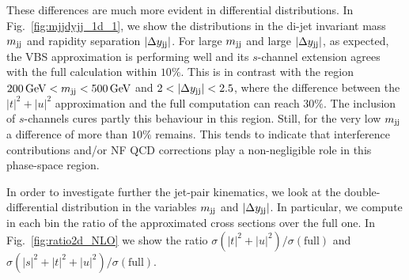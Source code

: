 These differences are much more evident in differential distributions.
In Fig.~\ref{fig:mjjdyjj_1d_1}, we show the distributions in the di-jet invariant mass $m_{\text{j}\text{j}}$ and rapidity separation $|\Delta y_{\text{j}\text{j}}|$.
For large $m_{\text{j}\text{j}}$ and large $|\Delta y_{\text{j}\text{j}}|$, as expected, the VBS approximation is performing well and its $s$-channel extension agrees with the full calculation within $10\%$.
This is in contrast with the region  $200 \,\text{GeV} < m_{\text{j}\text{j}} < 500 \,\text{GeV}$ and $2<|\Delta y_{\Pj\Pj}|<2.5$, where
the difference between the $|t|^2+|u|^2$ approximation and the full computation can reach $30\%$.
The inclusion of $s$-channels cures partly this behaviour in this region.
Still, for the very low $m_{\text{j}\text{j}}$ a difference of more than $10\%$ remains.
This tends to indicate that interference contributions and/or NF QCD corrections play a non-negligible role in this phase-space region.

In order to investigate further the jet-pair kinematics, we look at the double-differential distribution in the variables $m_{\text{j}\text{j}}$ and $|\Delta y_{\text{j}\text{j}}|$.
In particular, we compute in each bin the ratio of the approximated cross sections over the full one.
In Fig.~\ref{fig:ratio2d_NLO} we show the ratio $\sigma(|t|^2+|u|^2)/\sigma(\textrm{full})$ and $\sigma(|s|^2+|t|^2+|u|^2)/\sigma(\textrm{full})$.



